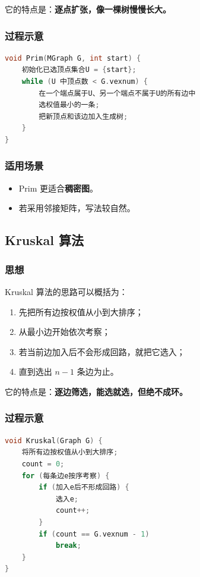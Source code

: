 \documentclass{../../note}
\begin{document}
它的特点是：\textbf{逐点扩张，像一棵树慢慢长大。}

\subsubsection{过程示意}

\begin{lstlisting}[language=C]
void Prim(MGraph G, int start) {
    初始化已选顶点集合U = {start};
    while (U 中顶点数 < G.vexnum) {
        在一个端点属于U、另一个端点不属于U的所有边中
        选权值最小的一条;
        把新顶点和该边加入生成树;
    }
}
\end{lstlisting}

\subsubsection{适用场景}

\begin{itemize}
  \item Prim 更适合\textbf{稠密图}。
  \item 若采用邻接矩阵，写法较自然。
\end{itemize}

\subsection{Kruskal 算法}

\subsubsection{思想}

Kruskal 算法的思路可以概括为：

\begin{enumerate}
  \item 先把所有边按权值从小到大排序；
  \item 从最小边开始依次考察；
  \item 若当前边加入后不会形成回路，就把它选入；
  \item 直到选出 $n-1$ 条边为止。
\end{enumerate}

它的特点是：\textbf{逐边筛选，能选就选，但绝不成环。}

\subsubsection{过程示意}

\begin{lstlisting}[language=C]
void Kruskal(Graph G) {
    将所有边按权值从小到大排序;
    count = 0;
    for (每条边e按序考察) {
        if (加入e后不形成回路) {
            选入e;
            count++;
        }
        if (count == G.vexnum - 1)
            break;
    }
}
\end{lstlisting}
\end{document}
